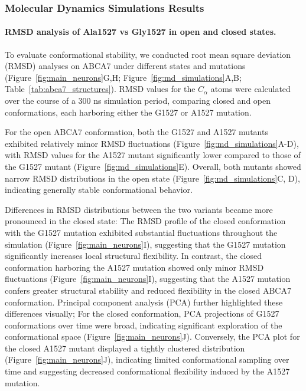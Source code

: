 \subsubsection{Molecular Dynamics Simulations Results} 
\paragraph{RMSD analysis of Ala1527 vs Gly1527 in open and closed states.}
To evaluate conformational stability, we conducted root mean square deviation (RMSD) analyses on ABCA7 under different states and mutations (Figure~\ref{fig:main_neurons}G,H; Figure~\ref{fig:md_simulations}A,B; Table~\ref{tab:abca7_structures}). RMSD values for the $C_\alpha$ atoms were calculated over the course of a 300 ns simulation period, comparing closed and open conformations, each harboring either the G1527 or A1527 mutation.

For the open ABCA7 conformation, both the G1527 and A1527 mutants exhibited relatively minor RMSD fluctuations (Figure~\ref{fig:md_simulations}A-D), with RMSD values for the A1527 mutant significantly lower compared to those of the G1527 mutant (Figure~\ref{fig:md_simulations}E). Overall, both mutants showed narrow RMSD distributions in the open state (Figure~\ref{fig:md_simulations}C, D), indicating generally stable conformational behavior. 

Differences in RMSD distributions between the two variants became more pronounced in the closed state: The RMSD profile of the closed conformation with the G1527 mutation exhibited substantial fluctuations throughout the simulation (Figure~\ref{fig:main_neurons}I), suggesting that the G1527 mutation significantly increases local structural flexibility. In contrast, the closed conformation harboring the A1527 mutation showed only minor RMSD fluctuations (Figure~\ref{fig:main_neurons}I), suggesting that the A1527 mutation confers greater structural stability and reduced flexibility in the closed ABCA7 conformation. Principal component analysis (PCA) further highlighted these differences visually; For the closed conformation, PCA projections of G1527 conformations over time were broad, indicating significant exploration of the conformational space (Figure~\ref{fig:main_neurons}J). Conversely, the PCA plot for the closed A1527 mutant displayed a tightly clustered distribution (Figure~\ref{fig:main_neurons}J), indicating limited conformational sampling over time and suggesting decreased conformational flexibility induced by the A1527 mutation.

